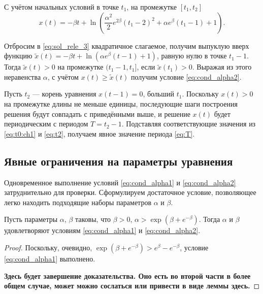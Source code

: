 С учётом начальных условий в точке $t_1$, на промежутке $[t_1, t_2]$
\begin{equation}
\label{eq:sol_rele_3}
    x(t) = -\beta t + \ln\left(\frac{\alpha^2}{2}e^{2\beta}(t_1 - 2)^2 + \alpha e^{\beta}(t_1 - 1) + 1\right).
\end{equation}

Отбросим в \eqref{eq:sol_rele_3} квадратичное слагаемое, получим выпуклую вверх функцию $\tilde{x}(t) = -\beta t + \ln(\alpha e^{\beta} (t - 1) + 1)$, равную нулю в точке $t_1 - 1$. Тогда $\tilde{x}(t) > 0$ на промежутке $(t_1 - 1, t_1]$, если $\tilde{x}(t_1) > 0$. Выражая из этого неравенства $\alpha$, с учётом $x(t) \geqslant \tilde{x}(t)$ получим условие \eqref{eq:cond_alpha2}.

Пусть $t_2$ --- корень уравнения $x(t - 1) = 0$, больший $t_1$. Поскольку $x(t) > 0$ на промежутке длины не меньше единицы, последующие шаги построения решения будут совпадать с приведёнными выше, и решение $x(t)$ будет периодическим с периодом $T = t_2 - 1$. Подставляя соответствующие значения из \eqref{eq:t0:ch1} и \eqref{eq:t2}, получаем явное значение периода \eqref{eq:T}.


\subsection{Явные ограничения на параметры уравнения}

Одновременное выполнение условий \eqref{eq:cond_alpha1} и \eqref{eq:cond_alpha2} затруднительно для проверки. Сформулируем достаточное условие, позволяющее легко находить подходящие наборы параметров $\alpha$ и $\beta$.

\begin{theorem}
Пусть параметры $\alpha$, $\beta$ таковы, что $\beta > 0$, $\alpha > \exp(\beta + e^{-\beta})$. Тогда $\alpha$ и $\beta$ удовлетворяют условиям \eqref{eq:cond_alpha1} и \eqref{eq:cond_alpha2}.
\end{theorem}
\begin{proof}
	Поскольку, очевидно, $\exp(\beta + e^{-\beta}) > e^{\beta} - e^{-\beta}$, условие \eqref{eq:cond_alpha1} выполнено.	
	
	\textbf{Здесь будет завершение доказательства. Оно есть во второй части в более общем случае, может можно сослаться или привести в виде леммы здесь.}
	
	
\end{proof}

